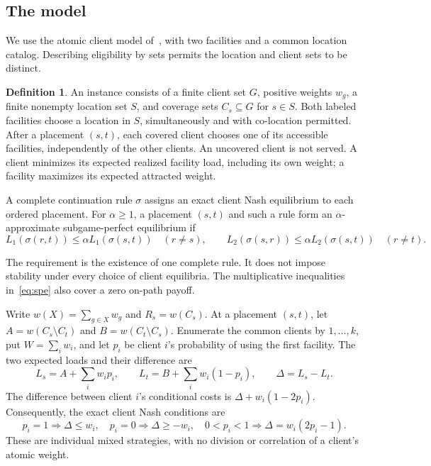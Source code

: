 \documentclass[11pt]{amsart}
\numberwithin{equation}{section}
\theoremstyle{definition}
\newtheorem{definition}[theorem]{Definition}
\begin{document}
\subsection{The model}
We use the atomic client model of~\cite[Section~1.1]{krogmann2024}, with two facilities and a common location catalog. Describing eligibility by sets permits the location and client sets to be distinct.
\begin{definition}\label{def:model}
An instance consists of a finite client set $G$, positive weights $w_g$, a finite nonempty location set $S$, and coverage sets $C_s\subseteq G$ for $s\in S$. Both labeled facilities choose a location in $S$, simultaneously and with co-location permitted. After a placement $(s,t)$, each covered client chooses one of its accessible facilities, independently of the other clients. An uncovered client is not served. A client minimizes its expected realized facility load, including its own weight; a facility maximizes its expected attracted weight.

A complete continuation rule $\sigma$ assigns an exact client Nash equilibrium to each ordered placement. For $\alpha\ge1$, a placement $(s,t)$ and such a rule form an $\alpha$-approximate subgame-perfect equilibrium if
\begin{equation}\label{eq:spe}
 L_1(\sigma(r,t))\le\alpha L_1(\sigma(s,t))\quad(r\ne s),\qquad
 L_2(\sigma(s,r))\le\alpha L_2(\sigma(s,t))\quad(r\ne t).
\end{equation}
\end{definition}
The requirement is the existence of one complete rule. It does not impose stability under every choice of client equilibria. The multiplicative inequalities in~\eqref{eq:spe} also cover a zero on-path payoff.

Write $w(X)=\sum_{g\in X}w_g$ and $R_s=w(C_s)$. At a placement $(s,t)$, let $A=w(C_s\setminus C_t)$ and $B=w(C_t\setminus C_s)$. Enumerate the common clients by $1,\ldots,k$, put $W=\sum_iw_i$, and let $p_i$ be client $i$'s probability of using the first facility. The two expected loads and their difference are
\begin{equation}\label{eq:loads}
 L_s=A+\sum_iw_ip_i,\qquad L_t=B+\sum_iw_i(1-p_i),\qquad\Delta=L_s-L_t.
\end{equation}
The difference between client $i$'s conditional costs is $\Delta+w_i(1-2p_i)$. Consequently, the exact client Nash conditions are
\begin{equation}\label{eq:ne}
 p_i=1\Rightarrow\Delta\le w_i,\quad
 p_i=0\Rightarrow\Delta\ge-w_i,\quad
 0<p_i<1\Rightarrow\Delta=w_i(2p_i-1).
\end{equation}
These are individual mixed strategies, with no division or correlation of a client's atomic weight.
\end{document}
